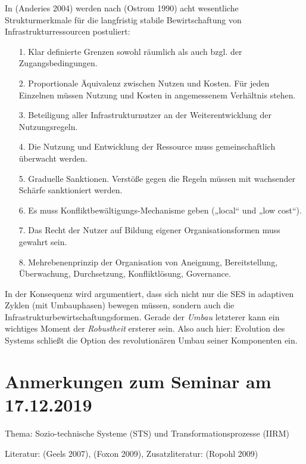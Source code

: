 \documentclass[11pt,a4paper]{article}
\begin{document}
In (Anderies 2004) werden nach (Ostrom 1990) acht wesentliche Strukturmerkmale
für die langfristig stabile Bewirtschaftung von Infrastrukturressourcen
postuliert: 
\begin{itemize}
\item[1.] Klar definierte Grenzen sowohl räumlich als auch bzgl. der
  Zugangsbedingungen.
\item[2.] Proportionale Äquivalenz zwischen Nutzen und Kosten. Für jeden
  Einzelnen müssen Nutzung und Kosten in angemessenem Verhältnis stehen.
\item[3.] Beteiligung aller Infrastrukturnutzer an der Weiterentwicklung der
  Nutzungsregeln.
\item[4.] Die Nutzung und Entwicklung der Ressource muss gemeinschaftlich
  überwacht werden.
\item[5.] Graduelle Sanktionen. Verstöße gegen die Regeln müssen mit
  wachsender Schärfe sanktioniert werden.
\item[6.] Es muss Konfliktbewältigungs-Mechanisme geben („local“ und „low
  cost“).
\item[7.] Das Recht der Nutzer auf Bildung eigener Organisationsformen muss
  gewahrt sein.
\item[8.] Mehrebenenprinzip der Organisation von Aneignung, Bereitstellung,
  Überwachung, Durchsetzung, Konfliktlösung, Governance.
\end{itemize}

In der Konsequenz wird argumentiert, dass sich nicht nur die SES in adaptiven
Zyklen (mit Umbauphasen) bewegen müssen, sondern auch die
Infrastrukturbewirtschaftungsformen. Gerade der \emph{Umbau} letzterer kann
ein wichtiges Moment der \emph{Robustheit} ersterer sein. Also auch hier:
Evolution des Systems schließt die Option des revolutionären Umbau seiner
Komponenten ein.

\section{ Anmerkungen zum Seminar am 17.12.2019}

Thema: Sozio-technische Systeme (STS) und Transformationsprozesse (IIRM)

Literatur: (Geels 2007), (Foxon 2009), Zusatzliteratur: (Ropohl 2009)
\end{document}
